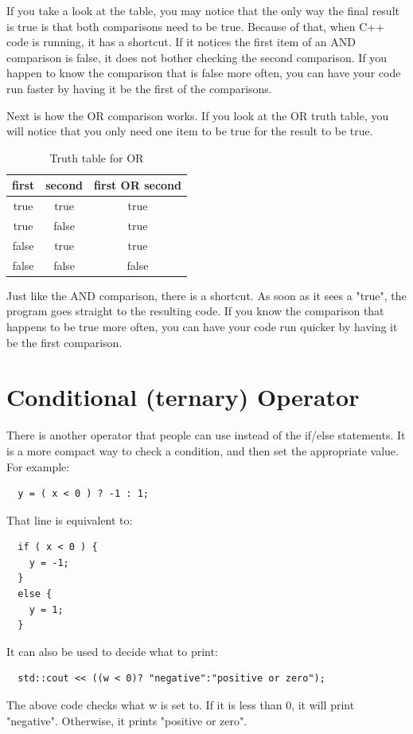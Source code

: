 If you take a look at the table, you may notice that the only way the final result is true is that both comparisons need to be true. Because of that, when C++ code is running, it has a shortcut. If it notices the first item of an AND comparison is false, it does not bother checking the second comparison. If you happen to know the comparison that is false more often, you can have your code run faster by having it be the first of the comparisons.

Next is how the OR comparison works. If you look at the OR truth table, you will notice that you only need one item to be true for the result to be true.
\vspace{0.1in}
\begin{table}[h]
\centering
\begin{tabular}{ | c | c | c | }
\hline
 first & second & first OR second \\\hline
 true & true & true \\ 
 true & false & true \\  
 false & true & true \\
 false & false & false \\
\hline
\end{tabular}
    \caption{Truth table for OR}
    \label{tab:ortruth}
\end{table}
\vspace{0.1in}
Just like the AND comparison, there is a shortcut. As soon as it sees a "true", the program goes straight to the resulting code. If you know the comparison that happens to be true more often, you can have your code run quicker by having it be the first comparison.

\section{Conditional (ternary) Operator}
There is another operator that people can use instead of the 
if/else statements. It is a more compact way to check a condition,
and then set the appropriate value. For example:
\begin{lstlisting}
  y = ( x < 0 ) ? -1 : 1;
\end{lstlisting}
That line is equivalent to:
\begin{lstlisting}
  if ( x < 0 ) {
    y = -1;
  }
  else {
    y = 1;
  }
\end{lstlisting}
It can also be used to decide what to print:
\begin{lstlisting}
  std::cout << ((w < 0)? "negative":"positive or zero");
\end{lstlisting}
The above code checks what w is set to. If it is less than 0, it 
will print "negative". Otherwise, it prints "positive or zero".

